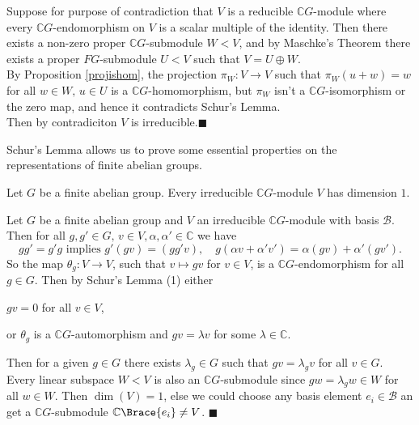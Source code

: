 \documentclass[../Project.tex]{subfiles}
\begin{document}
\begin{proo*}[{\cite[Proposition 9.2]{2}}]
	Suppose for purpose of contradiction that $V$ is a reducible $\mathbb{C}G$-module where every $\mathbb{C}G$-endomorphism on $V$ is a scalar multiple of the identity. Then there exists a non-zero proper $\mathbb{C}G$-submodule $W < V$, and by Maschke's Theorem there exists a proper $FG$-submodule $U < V$ such that $V = U \oplus W$.\\

	By Proposition \ref{projishom}, the projection $\pi_W : V \to V$ such that $\pi_W(u + w) = w$ for all $w \in W,\,u \in U$ is a $\mathbb{C}G$-homomorphism, but $\pi_W$ isn't a $\mathbb{C}G$-isomorphism or the zero map, and hence it contradicts Schur's Lemma.\\

	Then by contradiciton $V$ is irreducible.\hfill$\blacksquare$\\
\end{proo*}

Schur's Lemma allows us to prove some essential properties on the representations of finite abelian groups.
\begin{prop}[{\cite[Proposition 9.5]{2}}]
	\label{irrefinabelianhasdim1}
	Let $G$ be a finite abelian group. Every irreducible $\mathbb{C}G$-module $V$ has dimension $1$.
\end{prop}
\begin{proo*}
	Let $G$ be a finite abelian group and $V$ an irreducible $\mathbb{C}G$-module with basis $\mathcal{B}$. Then for all $g,g' \in G,\,v \in V,\alpha,\alpha' \in \mathbb{C}$ we have
	$$gg' = g'g \text{ implies } g'(gv) = (gg'v),\quad g(\alpha v + \alpha'v') = \alpha(gv) + \alpha'(gv').$$
	So the map $\theta_g : V \to V$, such that $v \mapsto gv$ for $v \in V$, is a $\mathbb{C}G$-endomorphism for all $g \in G$. Then by Schur's Lemma (1) either
	\begin{menum}
		\item $gv = 0$ for all $v \in V$,
		\item or $\theta_g$ is a $\mathbb{C}G$-automorphism and $gv = \lambda v$ for some $\lambda \in \mathbb{C}$.
	\end{menum}
	Then for a given $g \in G$ there exists $\lambda_g \in G$ such that $gv = \lambda_g v$ for all $v \in G$. Every linear subspace $W < V$ is also an $\mathbb{C}G$-submodule since $gw = \lambda_gw \in W$  for all $w \in W$. Then $\dim(V) = 1$, else we could choose any basis element $e_i \in \mathcal{B}$ an get a $\mathbb{C}G$-submodule $\mathbb{C}\Brace{e_i} \neq V$. \hfill$\blacksquare$\\
\end{proo*}
\end{document}
